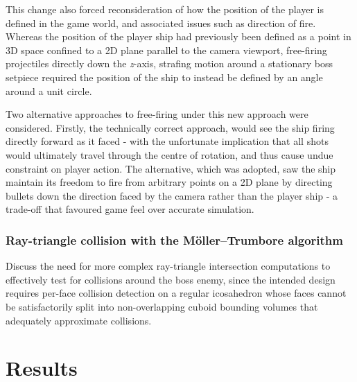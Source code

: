 \documentclass{article}
\begin{document}

This change also forced reconsideration of how the position of the player is defined
in the game world, and associated issues such as direction of fire. Whereas the position
of the player ship had previously been defined as a point in 3D space confined to a 2D
plane parallel to the camera viewport, free-firing projectiles directly down the \textit{z}-axis,
strafing motion around a stationary boss setpiece required the position of the ship to instead
be defined by an angle around a unit circle.

Two alternative approaches to free-firing under this new approach were considered. Firstly,
the technically correct approach, would see the ship firing directly forward as it faced - with
the unfortunate implication that all shots would ultimately travel through the centre of
rotation, and thus cause undue constraint on player action. The alternative, which was adopted,
saw the ship maintain its freedom to fire from arbitrary points on a 2D plane by directing
bullets down the direction faced by the camera rather than the player ship - a trade-off
that favoured game feel over accurate simulation.


\subsubsection*{Ray-triangle collision with the Möller–Trumbore algorithm}
Discuss the need for more complex ray-triangle intersection computations to effectively
test for collisions around the boss enemy, since the intended design requires per-face
collision detection on a regular icosahedron whose faces cannot be satisfactorily
split into non-overlapping cuboid bounding volumes that adequately approximate
collisions.

\section{Results}
\end{document}
